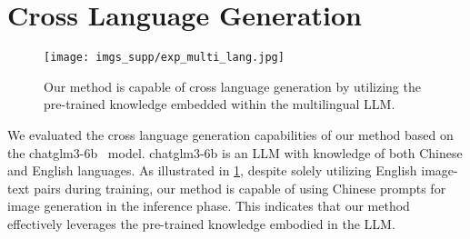 \clearpage
\setcounter{page}{1}
\maketitlesupplementary

\section{Cross Language Generation}


\begin{figure}[H]
    \centering
    \texttt{[image: imgs\_supp/exp\_multi\_lang.jpg]}
    \caption{
    Our method is capable of cross language generation by utilizing the pre-trained knowledge embedded within the multilingual LLM.
    }

    \label{fig:exp_multi_lang}
\end{figure}


We evaluated the cross language generation capabilities of our method based on the chatglm3-6b~\cite{glm} model. chatglm3-6b is an LLM with knowledge of both Chinese and English languages. As illustrated in \cref{fig:exp_multi_lang}, despite solely utilizing English image-text pairs during training, our method is capable of using Chinese prompts for image generation in the inference phase. This indicates that our method effectively leverages the pre-trained knowledge embodied in the LLM.
